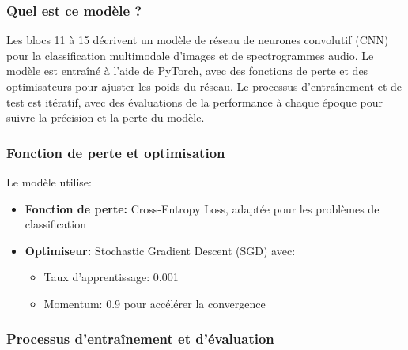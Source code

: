 \subsubsection{Quel est ce modèle ?}
\label{subsubsec:quel_modele}

Les blocs 11 à 15 décrivent un modèle de réseau de neurones convolutif (CNN) pour la classification multimodale d'images et de spectrogrammes audio. Le modèle est entraîné à l'aide de PyTorch, avec des fonctions de perte et des optimisateurs pour ajuster les poids du réseau. Le processus d'entraînement et de test est itératif, avec des évaluations de la performance à chaque époque pour suivre la précision et la perte du modèle.

\subsubsection{Fonction de perte et optimisation}
\label{subsubsec:loss_optim}

Le modèle utilise:
\begin{itemize}
    \item \textbf{Fonction de perte:} Cross-Entropy Loss, adaptée pour les problèmes de classification
    \item \textbf{Optimiseur:} Stochastic Gradient Descent (SGD) avec:
    \begin{itemize}
        \item Taux d'apprentissage: 0.001
        \item Momentum: 0.9 pour accélérer la convergence
    \end{itemize}
\end{itemize}

\subsubsection{Processus d'entraînement et d'évaluation}
\label{subsec:training}

